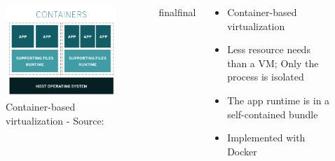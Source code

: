 \documentclass{beamer}
\def\final{final}
\def\status{final}
\begin{document}
\begin{frame}{}
  \begin{columns}[totalwidth=\textwidth]
    \begin{column}{0.5\textwidth}
      \begin{figure}
        \includegraphics[width=1.1\textwidth]{img/docker-vm-redhat.png}
        \caption{\footnotesize Container-based virtualization - \textcolor{uos-grey-full}{Source: {\cite{redhat_pic}}}}
      \end{figure}
    \end{column}

    \ifx\status\final{}
      \pause{}
    \fi


    \begin{column}{0.4\textwidth}
      \begin{itemize}
        \setlength\itemsep{0.6em}
        \item Container-based virtualization
        \item Less resource needs than a VM; Only the process is isolated
        \item The app runtime is in a self-contained bundle
        \item Implemented with Docker
      \end{itemize}
    \end{column}
  \end{columns}
\end{frame}
\end{document}
